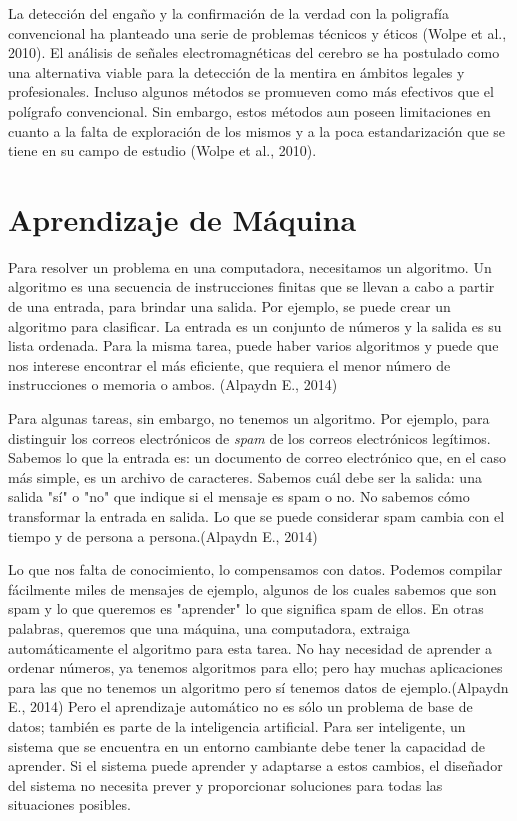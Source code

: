 La detección del engaño y la confirmación de la verdad con la poligrafía convencional ha planteado una serie de problemas técnicos y éticos (Wolpe et al., 2010).  El análisis de señales electromagnéticas del cerebro se ha postulado como una alternativa viable para la detección de la mentira en ámbitos legales y profesionales. Incluso algunos métodos se promueven como más efectivos que el polígrafo convencional. Sin embargo, estos métodos aun poseen limitaciones en cuanto a la falta de exploración de los mismos y a la poca estandarización que se tiene en su campo de estudio (Wolpe et al., 2010). 

\section{Aprendizaje de Máquina}
Para resolver un problema en una computadora, necesitamos un algoritmo.  Un algoritmo es una secuencia de instrucciones finitas que se llevan a cabo a partir de una entrada, para brindar una salida. Por ejemplo, se puede crear un algoritmo para clasificar. La entrada es un conjunto de números y la salida es su lista ordenada. Para la misma tarea, puede haber varios algoritmos y puede que nos interese encontrar el más eficiente, que requiera el menor número de instrucciones o memoria o ambos. (Alpaydn E., 2014)

Para algunas tareas, sin embargo, no tenemos un algoritmo. Por ejemplo, para distinguir los correos electrónicos de \textit{spam} de los correos electrónicos legítimos. Sabemos lo que la entrada es: un documento de correo electrónico que, en el caso más simple, es un archivo de caracteres. Sabemos cuál debe ser la salida: una salida "sí" o "no" que indique si el mensaje es spam o no.  No sabemos cómo transformar la entrada en salida. Lo que se puede considerar spam cambia con el tiempo y de persona a persona.(Alpaydn E., 2014)

Lo que nos falta de conocimiento, lo compensamos con datos. Podemos compilar fácilmente miles de mensajes de ejemplo, algunos de los cuales sabemos que son spam y lo que queremos es "aprender" lo que significa spam de ellos. En otras palabras, queremos que una máquina, una computadora, extraiga automáticamente el algoritmo para esta tarea.  No hay necesidad de aprender a ordenar números, ya tenemos algoritmos para ello; pero hay muchas aplicaciones para las que no tenemos un algoritmo pero sí tenemos datos de ejemplo.(Alpaydn E., 2014) Pero el aprendizaje automático no es sólo un problema de base de datos; también es parte de la inteligencia artificial.  Para ser inteligente, un sistema que se encuentra en un entorno cambiante debe tener la capacidad de aprender. Si el sistema puede aprender y adaptarse a estos cambios, el diseñador del sistema no necesita prever y proporcionar soluciones para todas las situaciones posibles.


